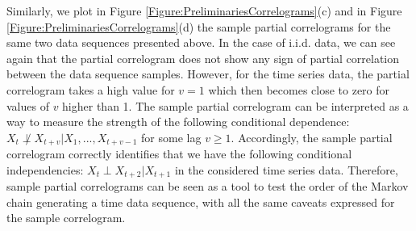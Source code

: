 Similarly, we plot in Figure \ref{Figure:PreliminariesCorrelograms}(c) and  in  Figure \ref{Figure:PreliminariesCorrelograms}(d) the sample partial correlograms for the same two data sequences presented above. In the case of i.i.d. data, we can see again that the partial correlogram does not show any sign of partial correlation between the data sequence samples. However, for the time series data, the partial correlogram takes a high value for $v=1$ which then becomes close to zero for values of $v$ higher than 1. The sample partial correlogram can be interpreted as a way to measure the strength of the following conditional dependence: $X_t  \not\perp X_{t+v} | X_1,...,X_{t+v-1}$ for some lag $v\geq 1$.  Accordingly, the sample partial correlogram correctly identifies that we have the following conditional independencies: $X_t\perp X_{t+2}|X_{t+1}$ in the considered time series data. Therefore, sample partial correlograms can be seen as a tool to test the order of the Markov chain generating a time data sequence, with all the same caveats expressed for the sample correlogram. 


